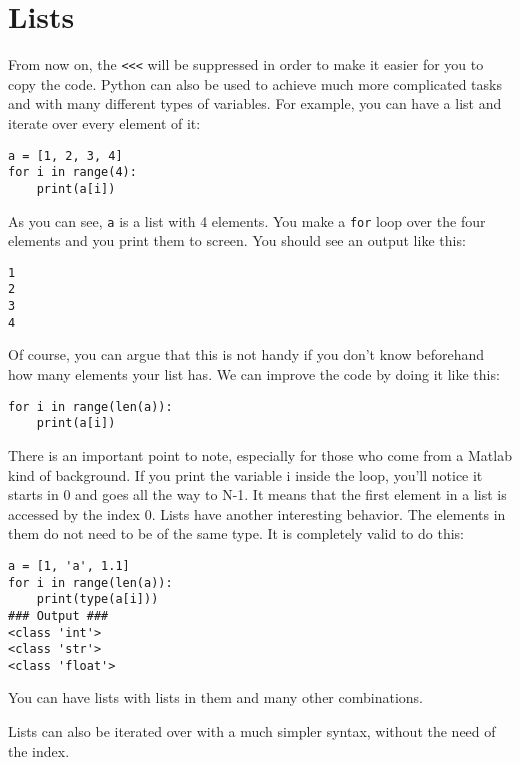 \section{Lists}\label{lists}
From now on, the \texttt{<<<}
will be suppressed in order to make it easier for you to copy the code.
Python can also be used to achieve much more complicated tasks and with
many different types of variables. For example, you can have a list and
iterate over every element of it:

\begin{verbatim}
a = [1, 2, 3, 4]
for i in range(4):
    print(a[i])
\end{verbatim}

As you can see, \texttt{a} is a list with 4 elements. You make a
\texttt{for} loop over the four elements and you print them to screen.
You should see an output like this:

\begin{verbatim}
1
2
3
4
\end{verbatim}

Of course, you can argue that this is not handy if you don't know
beforehand how many elements your list has. We can improve the code by
doing it like this:

\begin{verbatim}
for i in range(len(a)):
    print(a[i])
\end{verbatim}

There is an important point to note, especially for those who come from
a Matlab kind of background. If you print the variable i inside the
loop, you'll notice it starts in 0 and goes all the way to N-1. It means
that the first element in a list is accessed by the index 0. Lists have
another interesting behavior. The elements in them do not need to be of
the same type. It is completely valid to do this:

\begin{verbatim}
a = [1, 'a', 1.1]
for i in range(len(a)):
    print(type(a[i]))
### Output ###
<class 'int'>
<class 'str'>
<class 'float'>
\end{verbatim}

You can have lists with lists in them and many other combinations.


Lists can also be iterated over with a much simpler syntax, without the need of the index.

